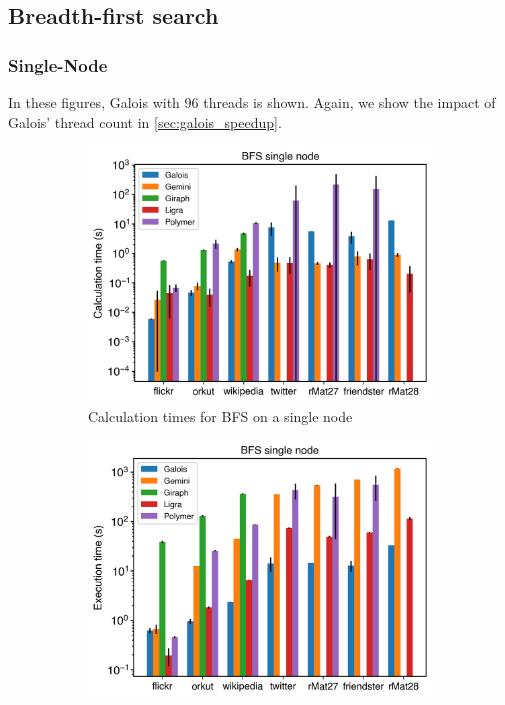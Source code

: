 
\subsection{Breadth-first search}
\subsubsection{Single-Node}


In these figures, Galois with 96 threads is shown. Again, we show the impact of Galois' thread count in \autoref{sec:galois_speedup}.
\begin{figure}
	\begin{subfigure}{0.3\textwidth}
		\includegraphics[width=\linewidth]{../../plots/singleNodeBFS_calcTime.png}
		\caption{Calculation times for BFS on a single node}
		\label{fig:singleNodeBFS_calc}
	\end{subfigure}
	\hfil
	\begin{subfigure}{0.3\textwidth}
		\includegraphics[width=\linewidth]{../../plots/singleNodeBFS_execTime.png}

\end{subfigure}
\end{figure}
